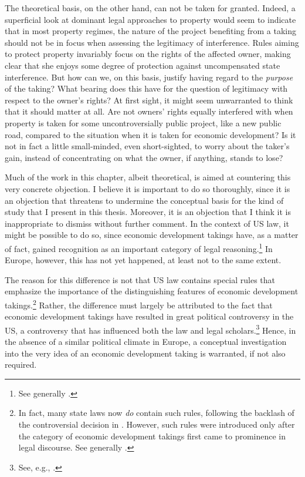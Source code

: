 \documentclass[12pt,a4paper]{book} %
\begin{document}
The theoretical basis, on the other hand, can not be taken for granted. Indeed, a superficial look at dominant legal approaches to property would seem to indicate that in most property regimes, the nature of the project benefiting from a taking should not be in focus when assessing the legitimacy of interference. Rules aiming to protect property invariably focus on the rights of the affected owner, making clear that she enjoys some degree of protection against uncompensated state interference. But how can we, on this basis, justify having regard to the {\it purpose} of the taking? What bearing does this have for the question of legitimacy with respect to the owner's rights? At first sight, it might seem unwarranted to think that it should matter at all. Are not owners' rights  equally interfered with when property is taken for some uncontroversially public project, like a new public road, compared to the situation when it is taken for economic development? Is it not in fact a little small-minded, even short-sighted, to worry about the taker's gain, instead of concentrating on what the owner, if anything, stands to lose?

Much of the work in this chapter, albeit theoretical, is aimed at countering this very concrete objection. I believe it is important to do so thoroughly, since it is an objection that threatens to undermine the conceptual basis for the kind of study that I present in this thesis. Moreover, it is an objection that I think it is inappropriate to dismiss without further comment. In the context of US law, it might be possible to do so, since economic development takings have, as a matter of fact, gained recognition as an important category of legal reasoning.\footnote{See generally \cite{cohen06,somin07,malloy08}.}  In Europe, however, this has not yet happened, at least not to the same extent.

The reason for this difference is not that US law contains special rules that emphasize the importance of the distinguishing features of economic development takings.\footnote{In fact, many state laws now {\it do} contain such rules, following the backlash of the controversial decision in \cite{kelo05}. However, such rules were introduced only after the category of economic development takings first came to prominence in legal discourse. See generally \cite{eagle08,somin09,jacobs11}.} Rather, the difference must largely be attributed to the fact that economic development takings have resulted in great political controversy in the US, a controversy that has influenced both the law and legal scholars.\footnote{See, e.g., \cite[1190-1192]{somin08}.} Hence, in the absence of a similar political climate in Europe, a conceptual investigation into the very idea of an economic development taking is warranted, if not also required.
\end{document}
